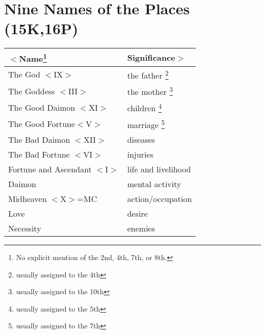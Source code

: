 \section{Nine Names of the Places (15K,16P)}

\begin{table}[ht]
\begin{center}
\begin{tabular}{ll}
\textbf{$<$Name}\footnote{No explicit mention of the 2nd, 4th, 7th, or 8th.}
			& \textbf{Significance$>$}	\\
\hline
The God $<$IX$>$ 			& the father
						\footnote{usually assigned to the 4th}		\\
The Goddess $<$III$>$		& the mother
						\footnote{usually assigned to the 10th}	\\
The Good Daimon $<$XI$>$	& children
						\footnote{usually assigned to the 5th}		\\
The Good Fortune$<$V$>$	& marriage
						\footnote{usually assigned to the 7th}		\\
The Bad Daimon $<$XII$>$	& diseases			\\
The Bad Fortune $<$VI$>$	& injuries			\\
\parbox{4.5cm}{
Fortune and Ascendant 
$<$I$>$}						& life and livelihood	\\
Daimon							& mental activity		\\
Midheaven $<$X$>$=MC		& action/occupation		\\
Love							& desire					\\
Necessity						& enemies					\\
\hline
\end{tabular}
\end{center}
\end{table}

\newpage